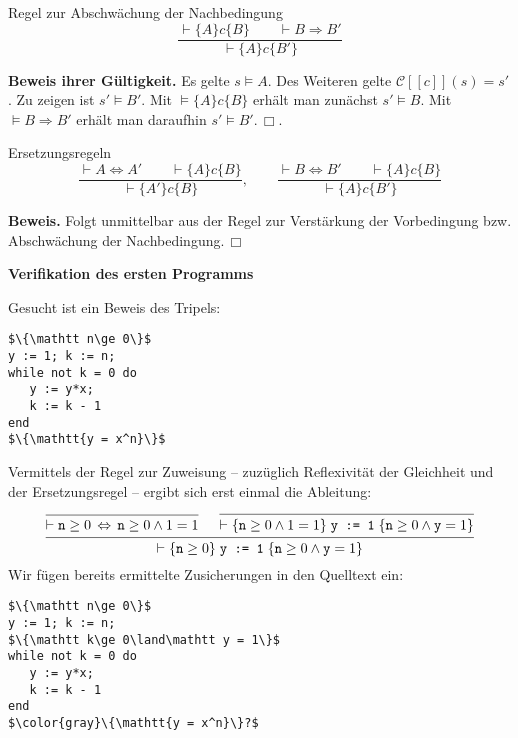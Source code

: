 \documentclass[8pt,fleqn,aspectratio=169]{beamer}
\newcommand{\strong}[1]{\textsf{\textbf{#1}}}
\renewcommand{\qedsymbol}{\ensuremath{\Box}}
\newcommand{\centerheadline}[1]{%
  \begin{center}\strong{#1}\end{center}}
\newcommand{\code}[1]{{\texttt{#1}}}
\newcommand{\qb}[1]{[\!\![#1]\!\!]}
\newcommand{\evC}{\mathcal C}
\begin{document}
\begin{frame}
\begin{block}{Regel zur Abschwächung der Nachbedingung}
\[\dfrac{\vdash\{A\}c\{B\}\qquad\vdash B\Rightarrow B'}{
\vdash\{A\}c\{B'\}}\]
\end{block}\pause
\strong{Beweis ihrer Gültigkeit.} Es gelte $s\models A$.
Des Weiteren gelte $\evC\qb{c}(s)=s'$. Zu zeigen ist $s'\models B'$.\pause{}
Mit $\models\{A\}c\{B\}$ erhält man zunächst $s'\models B$. Mit
$\models B\Rightarrow B'$ erhält man daraufhin $s'\models B'$.\,\qedsymbol.
\end{frame}

\begin{frame}
\begin{block}{Ersetzungsregeln}
\[\dfrac{\vdash A\Leftrightarrow A'\qquad\vdash\{A\}c\{B\}}{
  \vdash\{A'\}c\{B\}},\qquad
\dfrac{\vdash B\Leftrightarrow B'\qquad\vdash\{A\}c\{B\}}{
  \vdash\{A\}c\{B'\}}\]
\end{block}\pause
\strong{Beweis.} Folgt unmittelbar aus der Regel zur Verstärkung der
Vorbedingung bzw. Abschwächung der Nachbedingung.\,\qedsymbol
\end{frame}

\begin{frame}
\centerheadline{Verifikation des ersten Programms}
\end{frame}

\begin{frame}[fragile]
Gesucht ist ein Beweis des Tripels:
\begin{lstlisting}[language=IMP, xleftmargin=\mathindent, mathescape]
$\{\mathtt n\ge 0\}$
y := 1; k := n;
while not k = 0 do
   y := y*x;
   k := k - 1
end
$\{\mathtt{y = x^n}\}$
\end{lstlisting}
\end{frame}

\begin{frame}[fragile]
Vermittels der Regel zur Zuweisung -- zuzüglich Reflexivität der
Gleichheit und der Ersetzungsregel -- ergibt sich erst einmal die Ableitung:
\[\begin{prooftree}
  \infer0{\vdash \mathtt n\ge 0\,\Leftrightarrow\,\mathtt n\ge 0\land 1 = 1}
  \infer0{\vdash\{\mathtt n\ge 0\land 1 = 1\}\;\code{y := 1}\;\{\mathtt n\ge 0\land\mathtt y = 1\}}
\infer2{\vdash\{\mathtt n\ge 0\}\;\code{y := 1}\;\{\mathtt n\ge 0\land\mathtt y = 1\}}
\end{prooftree}\]\pause
Wir fügen bereits ermittelte Zusicherungen in den Quelltext ein:
\begin{lstlisting}[language=IMP, xleftmargin=\mathindent, mathescape]
$\{\mathtt n\ge 0\}$
y := 1; k := n;
$\{\mathtt k\ge 0\land\mathtt y = 1\}$
while not k = 0 do
   y := y*x;
   k := k - 1
end
$\color{gray}\{\mathtt{y = x^n}\}?$
\end{lstlisting}
\end{frame}
\end{document}
